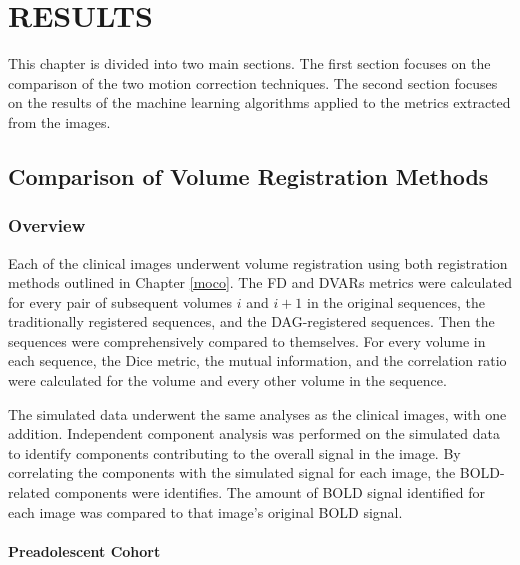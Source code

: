 \chapter{RESULTS}
\label{ch:results}

This chapter is divided into two main sections. The first section focuses on the comparison of the two motion correction techniques. The second section focuses on the results of the machine learning algorithms applied to the metrics extracted from the images.

\section{Comparison of Volume Registration Methods}

\subsection{Overview}

Each of the clinical images underwent volume registration using both registration methods outlined in Chapter \ref{moco}. The FD and DVARs metrics were calculated for every pair of subsequent volumes $i$ and $i+1$ in the original sequences, the traditionally registered sequences, and the DAG-registered sequences. Then the sequences were comprehensively compared to themselves. For every volume in each sequence, the Dice metric, the mutual information, and the correlation ratio were calculated for the volume and every other volume in the sequence.

The simulated data underwent the same analyses as the clinical images, with one addition. Independent component analysis was performed on the simulated data to identify components contributing to the overall signal in the image. By correlating the components with the simulated signal for each image, the BOLD-related components were identifies. The amount of BOLD signal identified for each image was compared to that image's original BOLD signal.

\subsubsection{Preadolescent Cohort}

